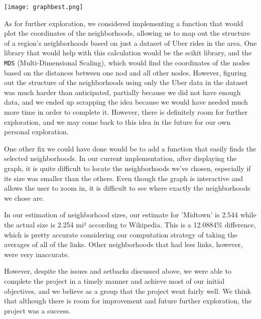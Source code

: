 \documentclass[fontsize=11pt]{article}
\begin{document}
\begin{center}
\texttt{[image: graphbest.png]}
\end{center}

As for further exploration, we considered implementing a function that would plot the coordinates of the neighborhoods, allowing us to map out the structure of a region's neighborhoods based on just a dataset of Uber rides in the area. One library that would help with this calculation would be the \texttt{}{scikit} library, and the \texttt{MDS} (Multi-Dimensional Scaling), which would find the coordinates of the nodes based on the distances between one nod and all other nodes. However, figuring out the structure of the neighborhoods using only the Uber data in the dataset was much harder than anticipated, partially because we did not have enough data, and we ended up scrapping the idea because we would have needed much more time in order to complete it. However, there is definitely room for further exploration, and we may come back to this idea in the future for our own personal exploration. \newline

One other fix we could have done would be to add a function that easily finds the selected neighborhoods. In our current implementation, after displaying the graph, it is quite difficult to locate the neighborhoods we've chosen, especially if its size was smaller than the others. Even though the graph is interactive and allows the user to zoom in, it is difficult to see where exactly the neighborhoods we chose are. \newline

In our estimation of neighborhood sizes, our estimate for 'Midtown' is 2.544 while the actual size is 2.254 mi² according to Wikipedia. This is a 12.0884\% difference, which is pretty accurate considering our computation strategy of taking the averages of all of the links. Other neighborhoods that had less links, however, were very inaccurate. \newline

However, despite the issues and setbacks discussed above, we were able to complete the project in a timely manner and achieve most of our initial objectives, and we believe as a group that the project went fairly well. We think that although there is room for improvement and future further exploration, the project was a success.
\end{document}
